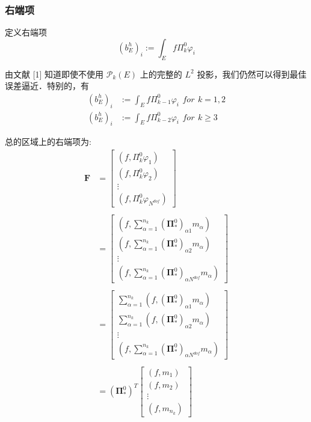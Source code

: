 \subsubsection{右端项}

定义右端项 \\
\begin{equation}
(b_E^h)_i := \int_{E}f\Pi_k^0\varphi_i
\end{equation}

由文献 [1] 知道即使不使用 $\mathcal P_k(E)$ 上的完整的 $L^2$ 投影，我们仍然可以得到最佳误差逼近．特别的，有 \\
\begin{equation}
\begin{aligned}
(b_E^h)_i & := \int_{E}f\Pi_{k-1}^0\varphi_i\,\ for \,\ k = 1,2 \\
(b_E^h)_i & := \int_{E}f\Pi_{k-2}^0\varphi_i\,\ for \,\ k \ge 3
\end{aligned}
\end{equation}

总的区域上的右端项为: \\
\begin{equation*}
\begin{aligned}
\mathbf F & = \begin{bmatrix}
(f, \Pi^0_k\varphi_1) \\
(f, \Pi^0_k\varphi_2) \\
\vdots\\
(f, \Pi^0_k\varphi_{N^{dof}})
\end{bmatrix} \\
\\
& = \begin{bmatrix}
(f,\sum_{\alpha = 1}^{n_k}(\boldsymbol \Pi_{*}^0)_{\alpha 1}m_\alpha) \\
(f,\sum_{\alpha = 1}^{n_k}(\boldsymbol \Pi_{*}^0)_{\alpha 2}m_\alpha) \\
\vdots \\
(f,\sum_{\alpha = 1}^{n_k}(\boldsymbol \Pi_{*}^0)_{\alpha N^{dof}}m_\alpha)
\end{bmatrix} \\
\\
& = \begin{bmatrix}
\sum_{\alpha = 1}^{n_k}(f,(\boldsymbol \Pi_{*}^0)_{\alpha 1}m_\alpha) \\
\sum_{\alpha = 1}^{n_k}(f,(\boldsymbol \Pi_{*}^0)_{\alpha 2}m_\alpha) \\
\vdots \\
(f,\sum_{\alpha = 1}^{n_k}(\boldsymbol \Pi_{*}^0)_{\alpha N^{dof}}m_\alpha)
\end{bmatrix} \\
\\
& =(\boldsymbol \Pi_{*}^0)^T\begin{bmatrix}
(f, m_1)\\ (f, m_2) \\ \vdots \\ (f, m_{n_k})
\end{bmatrix}
\end{aligned}
\end{equation*}

